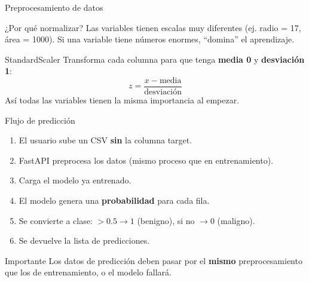 \documentclass[10pt,aspectratio=169]{beamer}
\begin{document}
\begin{frame}{Preprocesamiento de datos}
  \begin{block}{¿Por qué normalizar?}
    Las variables tienen escalas muy diferentes (ej. radio = 17, área = 1000).
    Si una variable tiene números enormes, ``domina'' el aprendizaje.
  \end{block}

  \pause
  \begin{block}{StandardScaler}
    Transforma cada columna para que tenga \textbf{media 0} y \textbf{desviación 1}:
    \[
      z = \frac{x - \text{media}}{\text{desviación}}
    \]
    Así todas las variables tienen la misma importancia al empezar.
  \end{block}
\end{frame}

\begin{frame}{Flujo de predicción}
  \begin{enumerate}
    \item El usuario sube un CSV \textbf{sin} la columna target.
    \item FastAPI preprocesa los datos (mismo proceso que en entrenamiento).
    \item Carga el modelo ya entrenado.
    \item El modelo genera una \textbf{probabilidad} para cada fila.
    \item Se convierte a clase: $>0.5 \rightarrow 1$ (benigno), si no $\rightarrow 0$ (maligno).
    \item Se devuelve la lista de predicciones.
  \end{enumerate}

  \pause
  \begin{exampleblock}{Importante}
    Los datos de predicción deben pasar por el \textbf{mismo} preprocesamiento
    que los de entrenamiento, o el modelo fallará.
  \end{exampleblock}
\end{frame}
\end{document}
